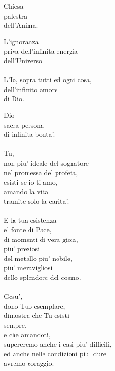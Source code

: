\begin{haiku}
    Chiesa\\
    palestra\\
    dell'Anima.\\
\end{haiku}

\begin{haiku}
    L'ignoranza\\
    priva dell'infinita energia\\
    dell'Universo.\\
    \leavevmode\\
    L'Io, sopra tutti ed ogni cosa,\\
    dell'infinito amore\\
    di Dio.\\
\end{haiku}

\begin{haiku}
Dio\\
sacra persona\\
di infinita bonta'.\\
\leavevmode\\
Tu,\\
non piu' ideale del sognatore\\
ne' promessa del profeta,\\
esisti se io ti amo,\\
amando la vita\\
tramite solo la carita'.\\
\leavevmode\\
E la tua esistenza\\
e' fonte di Pace,\\
di momenti di vera gioia,\\
piu' preziosi\\
del metallo piu' nobile,\\
piu' meravigliosi\\
dello splendore del cosmo.\\
\leavevmode\\
Gesu',\\
dono Tuo esemplare,\\
dimostra che Tu esisti\\
sempre,\\
e che amandoti,\\
supereremo anche i casi piu' difficili,\\
ed anche nelle condizioni piu' dure\\
avremo coraggio.\\
\end{haiku}


